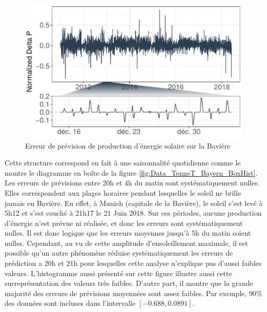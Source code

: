 \documentclass[12pt, french]{report}
\begin{document}
\begin{figure}[htb]
	\begin{center}
		\includegraphics[width = 0.8 \textwidth]{Images/Data/PV/Tennet/TennetPrdErrors_WholeZoom_Mod.pdf}
		\caption{Erreur de prévision de production d'énergie solaire sur la Bavière}
		\label{fig:Data_PV_PredErrs}
	\end{center}
\end{figure}

Cette structure correspond en fait à une saisonnalité quotidienne comme le montre le diagramme en boîte de la figure \ref{fig:Data_TenneT_Bayern_BoxHist}. Les erreurs de prévisions entre 20h et 4h du matin sont systématiquement nulles. Elles correspondent aux plages horaires pendant lesquelles le soleil ne brille jamais en Bavière. En effet, à Munich (capitale de la Bavière), le soleil s'est levé à 5h12 et s'est couché à 21h17 le 21 Juin 2018. Sur ces périodes, aucune production d'énergie n'est prévue ni réalisée, et donc les erreurs sont systématiquement nulles.  Il est donc logique que les erreurs moyennes jusqu'à 5h du matin soient nulles. Cependant, au vu de cette amplitude d'ensoleillement maximale, il est possible qu'un autre phénomène réduise systématiquement les erreurs de prédiction a 20h et 21h pour lesquelles cette analyse n'explique pas d'aussi faibles valeurs. L'histogramme aussi présenté sur cette figure illustre aussi cette surreprésentation des valeurs très faibles. D'autre part, il montre que la grande majorité des erreurs de prévisions moyennées sont assez faibles. Par exemple, $90 \%$ des données sont incluses dans l'intervalle $[-0.688 , 0.0891]$. 
\end{document}
